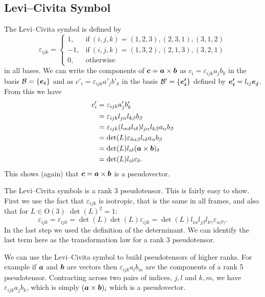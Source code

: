 \documentclass[a4paper]{article}
\newcommand{\orthogonalGroup}{\mathrm{O}}
\newcommand{\basis}{\mathcal{B}}
\begin{document}
    \subsection{Levi--Civita Symbol}
    The Levi--Civita symbol is defined by
    \[
        \varepsilon_{ijk} = 
        \begin{cases}
            1,  & \text{if}~(i, j, k) = (1, 2, 3), (2, 3, 1), (3, 1, 2)\\
            -1, & \text{if}~(i, j, k) = (1, 3, 2), (2, 1, 3), (3, 2, 1)\\
            0,  & \text{otherwise}
        \end{cases}
    \]
    in all bases.
    We can write the components of \(\bm{c} = \bm{a}\times\bm{b}\) as \(c_i = \varepsilon_{ijk}a_jb_k\) in the basis \(\basis = \{\ve{i}\}\) and as \(c'_i = \varepsilon_{ijk}a'_jb'_k\) in the basis \(\basis' = \{\vv{e'_i}\}\) defined by \(\bm{e'_i} = l_{ij}\bm{e_{j}}\).
    From this we have
    \begin{align*}
        c'_i &= \varepsilon_{ijk}a'_jb'_k\\
        &= \varepsilon_{ijk}l_{j\alpha}l_{k\beta}b_\beta\\
        &= \varepsilon_{ijk}(l_{m\delta}l_{i\delta})l_{j\alpha}l_{k\beta}a_\alpha b_\beta\\
        &= \det(L) \varepsilon_{\delta\alpha\beta}l_{i\delta}a_\alpha b_\beta\\
        &= \det(L) l_{i\delta}(\bm{a}\times\bm{b})_{\delta}\\
        &= \det(L)l_{i\delta}c_{\delta}.
    \end{align*}
    This shows (again) that \(\bm{c} = \bm{a}\times\bm{b}\) is a pseudovector.
    
    The Levi--Civita symbols is a rank 3 pseudotensor.
    This is fairly easy to show.
    First we use the fact that \(\varepsilon_{ijk}\) is isotropic, that is the same in all frames, and also that for \(L\in\orthogonalGroup(3)\) \(\det(L)^2 = 1\):
    \[\varepsilon_{ijk} = \varepsilon_{ijk} = \det(L)\det(L)\varepsilon_{ijk} = \det(L)l_{i\alpha}l_{j\beta}l_{k\gamma}\varepsilon_{\alpha\beta\gamma}.\]
    In the last step we used the definition of the determinant.
    We can identify the last term here as the transformation law for a rank 3 pseudotensor.
    
    We can use the Levi--Civita symbol to build pseudotensors of higher ranks.
    For example if \(\bm{a}\) and \(\bm{b}\) are vectors then \(\varepsilon_{ijk}a_lb_m\) are the components of a rank 5 pseudotensor.
    Contracting across two pairs of indices, \(j, l\) and \(k, m\), we have \(\varepsilon_{ijk}a_jb_k\), which is simply \((\bm{a}\times\bm{b})_i\) which is a pseudovector.
    
\end{document}
